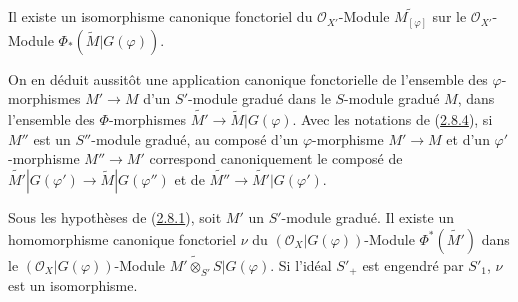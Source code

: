 \begin{proposition}[2.8.7]
\label{II.2.8.7-fr}
Il existe un isomorphisme canonique fonctoriel du $\mathcal{O}_{X'}$-Module
$\widetilde{M_{[\varphi]}}$ sur le
$\mathcal{O}_{X'}$-Module $\Phi_*(\widetilde{M}|G(\varphi))$.
\end{proposition}

On en déduit aussitôt une application canonique fonctorielle de l'ensemble
des $\varphi$-morphismes $M'\to M$ d'un $S'$-module gradué dans le $S$-module
gradué $M$, dans l'ensemble des $\Phi$-morphismes
$\widetilde{M'}\to\widetilde{M}|G(\varphi)$. Avec les notations de
(\hyperref[II.2.8.4-fr]{2.8.4}), si $M''$ est un $S''$-module gradué, au
composé d'un $\varphi$-morphisme $M'\to M$ et d'un $\varphi'$-morphisme
$M''\to M'$ correspond canoniquement le composé de
$\widetilde{M'}|G(\varphi')\to\widetilde{M}|G(\varphi'')$ et de
$\widetilde{M''}\to\widetilde{M'}|G(\varphi')$.

\begin{proposition}[2.8.8]
\label{II.2.8.8-fr}
Sous les hypothèses de (\hyperref[II.2.8.1-fr]{2.8.1}), soit $M'$ un
$S'$-module gradué. Il existe un homomorphisme canonique fonctoriel $\nu$ du
$(\mathcal{O}_X|G(\varphi))$-Module $\Phi^*(\widetilde{M'})$ dans le
$(\mathcal{O}_X|G(\varphi))$-Module
$\widetilde{M'\otimes_{S'}S}|G(\varphi)$. Si l'idéal $S'_+$
est engendré par $S'_1$, $\nu$ est un isomorphisme.
\end{proposition}

